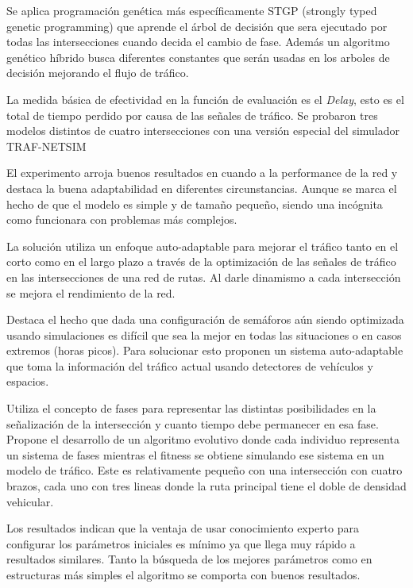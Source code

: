 \begin{itemize}
\begin{item}
		Se aplica programación genética más específicamente STGP (strongly typed genetic programming) \citep{Montana1995} que aprende el árbol de decisión que sera ejecutado por todas las intersecciones cuando decida el cambio de fase. Además un algoritmo genético híbrido busca diferentes constantes que serán usadas en los arboles de decisión mejorando el flujo de tráfico.
		
		La medida básica de efectividad en la función de evaluación es el \emph{Delay}, esto es el total de tiempo perdido por causa de las señales de tráfico. Se probaron tres modelos distintos de cuatro intersecciones con una versión especial del simulador  TRAF-NETSIM \citep{TRAF-NETSIM}
		
		El experimento arroja buenos resultados en cuando a la performance de la red y destaca la buena adaptabilidad en diferentes circunstancias. Aunque se marca el hecho de que el modelo es simple y de tamaño pequeño, siendo una incógnita como funcionara con problemas más complejos.
		
	\end{item}	
	
	
	\begin{item}
		
		La solución utiliza un enfoque auto-adaptable para mejorar el tráfico tanto en el corto como en el largo plazo a través de la optimización de las señales de tráfico en las intersecciones de una red de rutas. Al darle dinamismo a cada intersección se mejora el rendimiento de la red.
		
		Destaca el hecho que dada una configuración de semáforos aún siendo optimizada usando simulaciones es difícil que sea la mejor en todas las situaciones o en casos extremos (horas picos). Para solucionar esto proponen un sistema auto-adaptable que toma la información del tráfico actual usando detectores de vehículos y espacios.
		
		Utiliza el concepto de fases para representar las distintas posibilidades en la señalización de la intersección y cuanto tiempo debe permanecer en esa fase. 
		Propone el desarrollo de un algoritmo evolutivo donde cada individuo representa un sistema de fases mientras el fitness se obtiene simulando ese sistema en un modelo de tráfico. Este es relativamente pequeño con una intersección con cuatro brazos, cada uno con tres lineas donde la ruta principal tiene el doble de densidad vehicular. 
		
		Los resultados indican que la ventaja de usar conocimiento experto para configurar los parámetros iniciales es mínimo ya que llega muy rápido a resultados similares. Tanto la búsqueda de los mejores parámetros como en estructuras más simples el algoritmo se comporta con buenos resultados.
		

\end{item}
\end{itemize}

